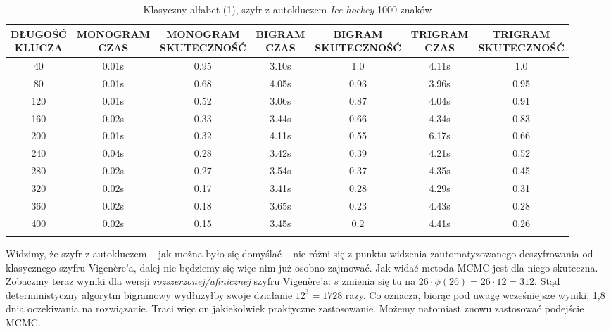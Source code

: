 \documentclass[a4paper]{article}
\theoremstyle{defn}
\theoremstyle{theorem}
\theoremstyle{lemma}
\theoremstyle{cor}
\theoremstyle{fact}
\begin{document}
\begin{center}\begin{small}\begin{longtable}{|c|c|c|c|c|c|c|} 
\hline \makecell{DŁUGOŚĆ\\KLUCZA} &  \makecell{MONOGRAM\\CZAS} & \makecell{MONOGRAM\\SKUTECZNOŚĆ} & \makecell{BIGRAM\\CZAS} &  \makecell{BIGRAM\\SKUTECZNOŚĆ} & \makecell{TRIGRAM\\CZAS} & \makecell{TRIGRAM\\SKUTECZNOŚĆ}\\ \hline 
40 & 0.01s & 0.95 & 3.10s & 1.0 & 4.11s & 1.0 \\ \hline 
80 & 0.01s & 0.68 & 4.05s & 0.93 & 3.96s & 0.95 \\ \hline 
120 & 0.01s & 0.52 & 3.06s & 0.87 & 4.04s & 0.91 \\ \hline 
160 & 0.02s & 0.33 & 3.44s & 0.66 & 4.34s & 0.83 \\ \hline 
200 & 0.01s & 0.32 & 4.11s & 0.55 & 6.17s & 0.66 \\ \hline 
240 & 0.04s & 0.28 & 3.42s & 0.39 & 4.21s & 0.52 \\ \hline 
280 & 0.02s & 0.27 & 3.54s & 0.37 & 4.35s & 0.45 \\ \hline 
320 & 0.02s & 0.17 & 3.41s & 0.28 & 4.29s & 0.31 \\ \hline 
360 & 0.02s & 0.18 & 3.65s & 0.23 & 4.43s & 0.28 \\ \hline 
400 & 0.02s & 0.15 & 3.45s & 0.2 & 4.41s & 0.26 \\ \hline 
\caption{Klasyczny alfabet (1), szyfr z autokluczem \textit{Ice hockey} 1000 znaków}
\end{longtable}\end{small}\end{center} 
Widzimy, że szyfr z autokluczem – jak można było się domyślać – nie różni się z punktu widzenia zautomatyzowanego deszyfrowania od klasycznego szyfru Vigenère'a, dalej nie będziemy się więc nim już osobno zajmować. Jak widać metoda MCMC jest dla niego skuteczna.\\
Zobaczmy teraz wyniki dla wersji \textit{rozszerzonej/afinicznej} szyfru Vigenère'a: $s$ zmienia się tu na $26\cdot \phi(26) = 26 \cdot 12 = 312$. Stąd deterministyczny algorytm bigramowy wydłużyłby swoje działanie $12^3 = 1728$ razy. Co oznacza, biorąc pod uwagę wcześniejsze wyniki, 1,8 dnia oczekiwania na rozwiązanie. Traci więc on jakiekolwiek praktyczne zastosowanie. Możemy natomiast znowu zastosować podejście MCMC.
\end{document}
